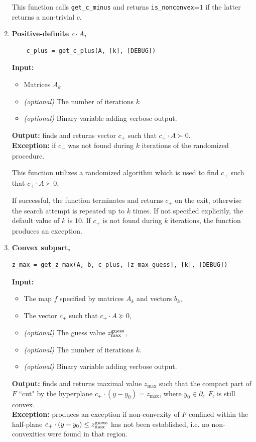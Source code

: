\documentclass[a4paper]{article}
\theoremstyle{definition}
\begin{document}
\begin{enumerate}
	
This function calls {\tt get\_c\_minus} and returns  {\tt is\_nonconvex}=$1$ if the latter returns a non-trivial $c$. 


\item {\bf Positive-definite $c\cdot A$,\hskip 6pt}
\begin{verbatim}
	c_plus = get_c_plus(A, [k], [DEBUG])
\end{verbatim}

{\bf Input:}
\begin{itemize}
	\item Matrices $A_k$
	\item {\it (optional)} The number of iterations $k$
	\item {\it (optional)} Binary variable adding verbose output.
\end{itemize}
{\bf Output:} finds and returns vector $c_+$ such that $c_+\cdot A\succ 0$.\\
{\bf Exception:} if $c_+$  was not found during $k$ iterations of the randomized procedure.
	
This function utilizes a randomized algorithm which is used to find $c_+$ such that $c_+\cdot A\succ 0$.

If successful, the function terminates and returns $c_+$ on the exit, otherwise the search attempt is repeated up to $k$ times.
If not specified explicitly, the default value of $k$ is $10$.
If $c_+$ is not found during $k$ iterations, the function produces an exception.

\newpage
	
\item {\bf Convex subpart,\hskip 6pt}
\begin{verbatim}
z_max = get_z_max(A, b, c_plus, [z_max_guess], [k], [DEBUG])
\end{verbatim}
{\bf Input:}
\begin{itemize}
	\item The map $f$ specified by matrices $A_k$ and vectors $b_k$,
	\item The vector $c_+$ such that $c_+\cdot A\succeq 0$,
	\item {\it (optional)} The guess value  $z^{\rm guess}_{\rm max}$,
	\item {\it (optional)} The number of iterations $k$.
	\item {\it (optional)} Binary variable adding verbose output.
\end{itemize}
{\bf Output:} finds and returns maximal value $z_{\max}$ such that the compact part of $F$ ``cut" by the hyperplane  $c_+ \cdot (y-y_0)=z_{\max}$, where $y_0\in \partial_{c_+}F$, is still convex. \\
{\bf Exception:} produces an exception if non-convexity of $F$ confined within the half-plane $c_+ \cdot (y-y_0)\leq z^{\rm guess}_{\rm max}$  has not been established, i.e. no non-convexities were found in that region.


\end{enumerate}
\end{document}
